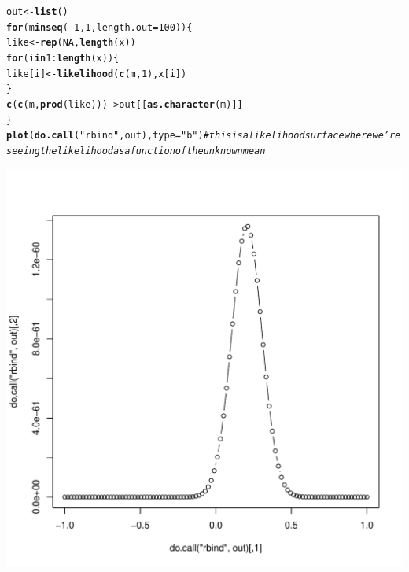 \documentclass[letterpaper,12pt]{article}\usepackage[]{graphicx}\usepackage[]{color}
\makeatletter
\def\maxwidth{ %
  \ifdim\Gin@nat@width>\linewidth
    \linewidth
  \else
    \Gin@nat@width
  \fi
}
\newcommand{\hlnum}[1]{\textcolor[rgb]{0.686,0.059,0.569}{#1}}%
\newcommand{\hlstr}[1]{\textcolor[rgb]{0.192,0.494,0.8}{#1}}%
\newcommand{\hlcom}[1]{\textcolor[rgb]{0.678,0.584,0.686}{\textit{#1}}}%
\newcommand{\hlopt}[1]{\textcolor[rgb]{0,0,0}{#1}}%
\newcommand{\hlstd}[1]{\textcolor[rgb]{0.345,0.345,0.345}{#1}}%
\newcommand{\hlkwa}[1]{\textcolor[rgb]{0.161,0.373,0.58}{\textbf{#1}}}%
\newcommand{\hlkwb}[1]{\textcolor[rgb]{0.69,0.353,0.396}{#1}}%
\newcommand{\hlkwc}[1]{\textcolor[rgb]{0.333,0.667,0.333}{#1}}%
\newcommand{\hlkwd}[1]{\textcolor[rgb]{0.737,0.353,0.396}{\textbf{#1}}}%
\newenvironment{kframe}{%
 \def\at@end@of@kframe{}%
 \ifinner\ifhmode%
  \def\at@end@of@kframe{\end{minipage}}%
  \begin{minipage}{\columnwidth}%
 \fi\fi%
 \def\FrameCommand##1{\hskip\@totalleftmargin \hskip-\fboxsep
 \colorbox{shadecolor}{##1}\hskip-\fboxsep
     \hskip-\linewidth \hskip-\@totalleftmargin \hskip\columnwidth}%
 \MakeFramed {\advance\hsize-\width
   \@totalleftmargin\z@ \linewidth\hsize
   \@setminipage}}%
 {\par\unskip\endMakeFramed%
 \at@end@of@kframe}
\newenvironment{knitrout}{}{} %
\numberwithin{equation}{section}
\makeatother
\begin{document}
\begin{knitrout}
\color{fgcolor}\begin{kframe}
\begin{alltt}
\hlstd{out}\hlkwb{<-}\hlkwd{list}\hlstd{()}
\hlkwa{for} \hlstd{(m} \hlkwa{in} \hlkwd{seq}\hlstd{(}\hlopt{-}\hlnum{1}\hlstd{,}\hlnum{1}\hlstd{,}\hlkwc{length.out}\hlstd{=}\hlnum{100}\hlstd{)) \{}
    \hlstd{like}\hlkwb{<-}\hlkwd{rep}\hlstd{(}\hlnum{NA}\hlstd{,}\hlkwd{length}\hlstd{(x))}
    \hlkwa{for} \hlstd{(i} \hlkwa{in} \hlnum{1}\hlopt{:}\hlkwd{length}\hlstd{(x)) \{}
        \hlstd{like[i]}\hlkwb{<-}\hlkwd{likelihood}\hlstd{(}\hlkwd{c}\hlstd{(m,}\hlnum{1}\hlstd{),x[i])}
    \hlstd{\}}
    \hlkwd{c}\hlstd{(}\hlkwd{c}\hlstd{(m,}\hlkwd{prod}\hlstd{(like)))}\hlkwb{->}\hlstd{out[[}\hlkwd{as.character}\hlstd{(m) ]]}
\hlstd{\}}
\hlkwd{plot}\hlstd{(}\hlkwd{do.call}\hlstd{(}\hlstr{"rbind"}\hlstd{,out),}\hlkwc{type}\hlstd{=}\hlstr{"b"}\hlstd{)} \hlcom{#this is a likelihood surface where we're seeing the likelihood as a function of the unknown mean}
\end{alltt}
\end{kframe}
\includegraphics[width=\maxwidth]{figure/unnamed-chunk-10-1} 

\end{knitrout}
\end{document}
